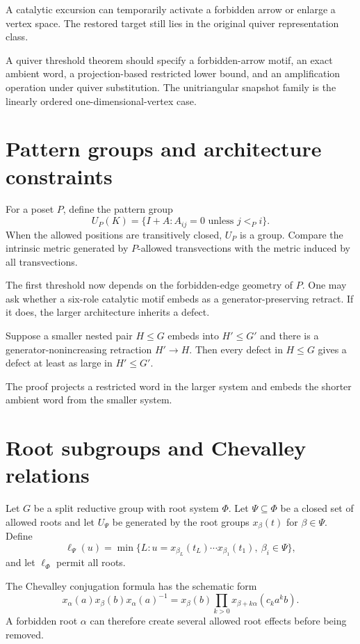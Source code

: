 A catalytic excursion can temporarily activate a forbidden arrow or enlarge a vertex space.  The restored target still lies in the original quiver representation class.

\begin{skeletonbox}
A quiver threshold theorem should specify a forbidden-arrow motif, an exact ambient word, a projection-based restricted lower bound, and an amplification operation under quiver substitution.  The unitriangular snapshot family is the linearly ordered one-dimensional-vertex case.
\end{skeletonbox}

\section{Pattern groups and architecture constraints}
For a poset $P$, define the pattern group
\[
U_P(K)
=
\{I+A:A_{ij}=0\text{ unless }j<_P i\}.
\]
When the allowed positions are transitively closed, $U_P$ is a group.  Compare the intrinsic metric generated by $P$-allowed transvections with the metric induced by all transvections.

The first threshold now depends on the forbidden-edge geometry of $P$.  One may ask whether a six-role catalytic motif embeds as a generator-preserving retract.  If it does, the larger architecture inherits a defect.

\begin{proposition}
Suppose a smaller nested pair $H\le G$ embeds into $H'\le G'$ and there is a generator-nonincreasing retraction $H'\to H$.  Then every defect in $H\le G$ gives a defect at least as large in $H'\le G'$.
\end{proposition}
The proof projects a restricted word in the larger system and embeds the shorter ambient word from the smaller system.

\section{Root subgroups and Chevalley relations}
Let $G$ be a split reductive group \cite{Carter1972,Humphreys1975} with root system $\Phi$.  Let $\Psi\subseteq\Phi$ be a closed set of allowed roots and let $U_\Psi$ be generated by the root groups $x_\beta(t)$ for $\beta\in\Psi$.  Define
\[
\ell_\Psi(u)
=
\min\{L:u=x_{\beta_L}(t_L)\cdots x_{\beta_1}(t_1),\ \beta_i\in\Psi\},
\]
and let $\ell_\Phi$ permit all roots.

The Chevalley conjugation formula has the schematic form
\[
x_\alpha(a)x_\beta(b)x_\alpha(a)^{-1}
=
x_\beta(b)
\prod_{k>0}
x_{\beta+k\alpha}(c_k a^k b).
\]
A forbidden root $\alpha$ can therefore create several allowed root effects before being removed.

